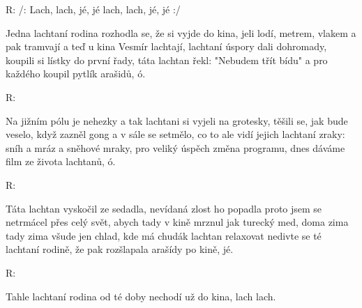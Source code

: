 \resetVars
{}
\MakeHeader
\Lyrics

R: /: Lach, lach, jé, jé  lach, lach, jé, jé :/

Jedna lachtaní rodina rozhodla se, že si vyjde do kina,
jeli lodí, metrem, vlakem a pak tramvají a teď u kina Vesmír lachtají,
lachtaní úspory dali dohromady, koupili si lístky do první řady,
táta lachtan řekl: "Nebudem třít bídu" a pro každého koupil pytlík arašidů, ó.

R:

Na jižním pólu je nehezky a tak lachtani si vyjeli na grotesky,
těšili se, jak bude veselo, když zazněl gong a v sále se setmělo,
co to ale vidí jejich lachtaní zraky: sníh a mráz a sněhové mraky,
pro veliký úspěch změna programu, dnes dáváme film ze života lachtanů, ó.

R:

Táta lachtan vyskočil ze sedadla, nevídaná zlost ho popadla
proto jsem se netrmácel přes celý svět, abych tady v kině mrznul jak turecký med,
doma zima tady zima všude jen chlad, kde má chudák lachtan relaxovat
nedivte se té lachtaní rodině, že pak rozšlapala arašídy po kině, jé.

R:

Tahle lachtaní rodina od té doby nechodí už do kina,
lach lach.

\Next
